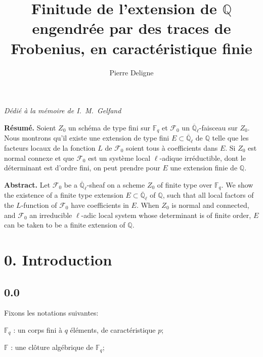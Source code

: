 \documentclass[10pt,a4paper]{article}
\theoremstyle{plain}
\theoremstyle{definition}
\begin{document}
\title{Finitude de l'extension de $\mathbb{Q}$ engendr\'ee par des traces de Frobenius, en caract\'eristique finie}
\author{Pierre Deligne}
\date{}
\maketitle

\begin{center}
\textit{D\'edi\'e \`a la m\'emoire de I.~M.~Gelfand}
\end{center}

\noindent\textbf{R\'esum\'e.} Soient $Z_0$ un sch\'ema de type fini sur $\mathbb{F}_q$ et $\mathcal{F}_0$ un $\overline{\mathbb{Q}}_\ell$-faisceau sur $Z_0$. Nous montrons qu'il existe une extension de type fini $E \subset \overline{\mathbb{Q}}_\ell$ de $\mathbb{Q}$ telle que les facteurs locaux de la fonction $L$ de $\mathcal{F}_0$ soient tous \`a coefficients dans $E$. Si $Z_0$ est normal connexe et que $\mathcal{F}_0$ est un syst\`eme local $\ell$-adique irr\'eductible, dont le d\'eterminant est d'ordre fini, on peut prendre pour $E$ une extension finie de $\mathbb{Q}$.

\medskip
\noindent\textbf{Abstract.} Let $\mathcal{F}_0$ be a $\overline{\mathbb{Q}}_\ell$-sheaf on a scheme $Z_0$ of finite type over $\mathbb{F}_q$. We show the existence of a finite type extension $E \subset \overline{\mathbb{Q}}_\ell$ of $\mathbb{Q}$, such that all local factors of the $L$-function of $\mathcal{F}_0$ have coefficients in $E$. When $Z_0$ is normal and connected, and $\mathcal{F}_0$ an irreducible $\ell$-adic local system whose determinant is of finite order, $E$ can be taken to be a finite extension of $\mathbb{Q}$.

\tableofcontents

\section*{0. Introduction}

\subsection*{0.0}

Fixons les notations suivantes:

$\mathbb{F}_q$ : un corps fini \`a $q$ \'el\'ements, de caract\'eristique $p$;

$\mathbb{F}$ : une cl\^oture alg\'ebrique de $\mathbb{F}_q$;
\end{document}
